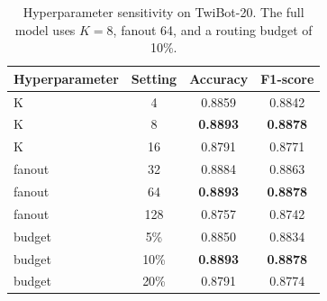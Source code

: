 \begin{table}[t]
\caption{Hyperparameter sensitivity on TwiBot-20. The full model uses $K=8$, fanout 64, and a routing budget of 10\%.}
\label{tab:hparam-sensitivity}
\centering
\small
\begin{tabular}{lccc}
\toprule
Hyperparameter & Setting & Accuracy & F1-score \\
\midrule
K & 4 & 0.8859 & 0.8842 \\
K & 8 & \textbf{0.8893} & \textbf{0.8878} \\
K & 16 & 0.8791 & 0.8771 \\
fanout & 32 & 0.8884 & 0.8863 \\
fanout & 64 & \textbf{0.8893} & \textbf{0.8878} \\
fanout & 128 & 0.8757 & 0.8742 \\
budget & 5\% & 0.8850 & 0.8834 \\
budget & 10\% & \textbf{0.8893} & \textbf{0.8878} \\
budget & 20\% & 0.8791 & 0.8774 \\
\bottomrule
\end{tabular}
\end{table}
